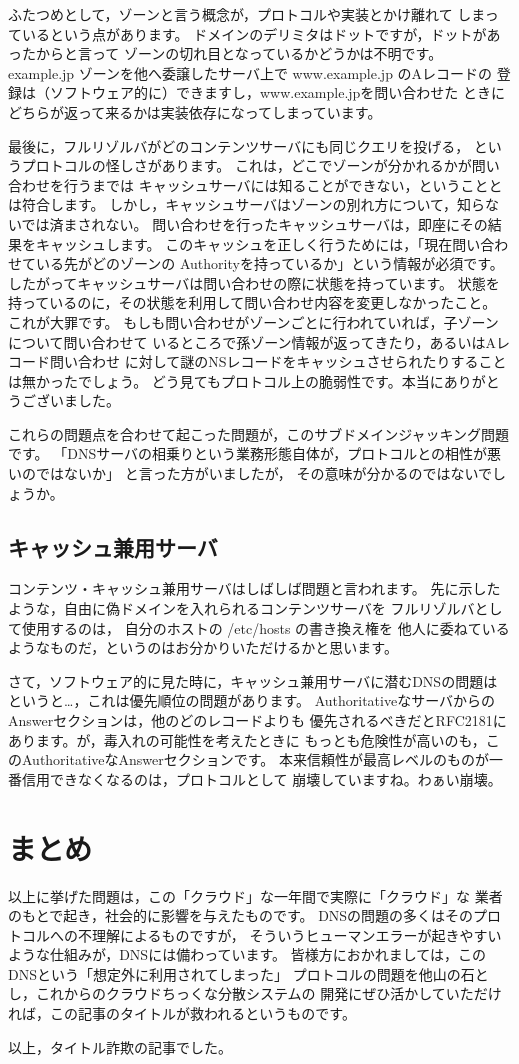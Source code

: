 ふたつめとして，ゾーンと言う概念が，プロトコルや実装とかけ離れて
しまっているという点があります。
ドメインのデリミタはドットですが，ドットがあったからと言って
ゾーンの切れ目となっているかどうかは不明です。
example.jp ゾーンを他へ委譲したサーバ上で www.example.jp のAレコードの
登録は（ソフトウェア的に）できますし，www.example.jpを問い合わせた
ときにどちらが返って来るかは実装依存になってしまっています。

最後に，フルリゾルバがどのコンテンツサーバにも同じクエリを投げる，
というプロトコルの怪しさがあります。
これは，どこでゾーンが分かれるかが問い合わせを行うまでは
キャッシュサーバには知ることができない，ということとは符合します。
しかし，キャッシュサーバはゾーンの別れ方について，知らないでは済まされない。
問い合わせを行ったキャッシュサーバは，即座にその結果をキャッシュします。
このキャッシュを正しく行うためには，「現在問い合わせている先がどのゾーンの
Authorityを持っているか」という情報が必須です。
したがってキャッシュサーバは問い合わせの際に状態を持っています。
状態を持っているのに，その状態を利用して問い合わせ内容を変更しなかったこと。
これが大罪です。
もしも問い合わせがゾーンごとに行われていれば，子ゾーンについて問い合わせて
いるところで孫ゾーン情報が返ってきたり，あるいはAレコード問い合わせ
に対して謎のNSレコードをキャッシュさせられたりすることは無かったでしょう。
どう見てもプロトコル上の脆弱性です。本当にありがとうございました。

これらの問題点を合わせて起こった問題が，このサブドメインジャッキング問題です。
「DNSサーバの相乗りという業務形態自体が，プロトコルとの相性が悪いのではないか」
と言った方がいましたが， その意味が分かるのではないでしょうか。


\subsection{ キャッシュ兼用サーバ }
コンテンツ・キャッシュ兼用サーバはしばしば問題と言われます。
先に示したような，自由に偽ドメインを入れられるコンテンツサーバを
フルリゾルバとして使用するのは， 自分のホストの /etc/hosts の書き換え権を
他人に委ねているようなものだ，というのはお分かりいただけるかと思います。

さて，ソフトウェア的に見た時に，キャッシュ兼用サーバに潜むDNSの問題は
というと…，これは優先順位の問題があります。
AuthoritativeなサーバからのAnswerセクションは，他のどのレコードよりも
優先されるべきだとRFC2181にあります。が，毒入れの可能性を考えたときに
もっとも危険性が高いのも，このAuthoritativeなAnswerセクションです。
本来信頼性が最高レベルのものが一番信用できなくなるのは，プロトコルとして
崩壊していますね。わぁい崩壊。


\section{まとめ}
以上に挙げた問題は，この「クラウド」な一年間で実際に「クラウド」な
業者のもとで起き，社会的に影響を与えたものです。
DNSの問題の多くはそのプロトコルへの不理解によるものですが，
そういうヒューマンエラーが起きやすいような仕組みが，DNSには備わっています。
皆様方におかれましては，このDNSという「想定外に利用されてしまった」
プロトコルの問題を他山の石とし，これからのクラウドちっくな分散システムの
開発にぜひ活かしていただければ，この記事のタイトルが救われるというものです。

以上，タイトル詐欺の記事でした。

